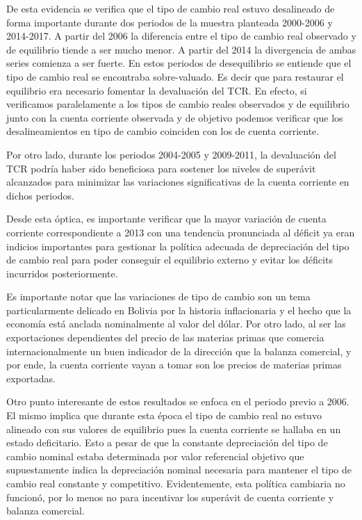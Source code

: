 \documentclass[12pt,letterpaper]{article}
\begin{document}
De esta evidencia se verifica que el tipo de cambio real estuvo desalineado de forma importante durante dos periodos de la muestra planteada 2000-2006 y 2014-2017. A partir del 2006 la diferencia entre el tipo de cambio real observado y de equilibrio tiende a ser mucho menor. A partir del 2014 la divergencia de ambas series comienza a ser fuerte. En estos periodos de desequilibrio se entiende que el tipo de cambio real se encontraba sobre-valuado. Es decir que para restaurar el equilibrio era necesario fomentar la devaluación del TCR. En efecto, si verificamos paralelamente a los tipos de cambio reales observados y de equilibrio junto con la cuenta corriente observada y de objetivo podemos verificar que los desalineamientos en tipo de cambio coinciden con los de cuenta corriente. 

Por otro lado, durante los periodos 2004-2005 y 2009-2011, la devaluación del TCR podría haber sido beneficiosa para sostener los niveles de superávit alcanzados para minimizar las variaciones significativas de la cuenta corriente en dichos periodos.

Desde esta óptica, es importante verificar que la mayor variación de cuenta corriente correspondiente a 2013 con una tendencia pronunciada al déficit ya eran indicios importantes para gestionar la política adecuada de depreciación del tipo de cambio real para poder conseguir el equilibrio externo y evitar los déficits incurridos posteriormente.

Es importante notar que las variaciones de tipo de cambio son un tema particularmente delicado en Bolivia por la historia inflacionaria y el hecho que la economía está anclada nominalmente al valor del dólar. Por otro lado, al ser las exportaciones dependientes del precio de las materias primas que comercia internacionalmente un buen indicador de la dirección que la balanza comercial, y por ende, la cuenta corriente vayan a tomar son los precios de materias primas exportadas.

Otro punto interesante de estos resultados se enfoca en el periodo previo a 2006. El mismo implica que durante esta época el tipo de cambio real no estuvo alineado con sus valores de equilibrio pues la cuenta corriente se hallaba en un estado deficitario. Esto a pesar de que la constante depreciación del tipo de cambio nominal estaba determinada por valor referencial objetivo que supuestamente indica la depreciación nominal necesaria para mantener el tipo de cambio real constante y competitivo. Evidentemente, esta política cambiaria no funcionó, por lo menos no para incentivar los superávit de cuenta corriente y balanza comercial.
\end{document}
